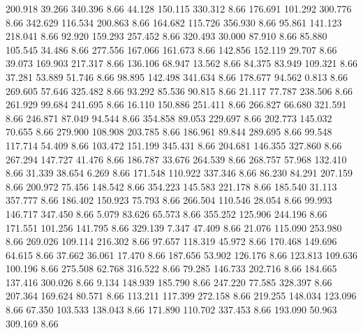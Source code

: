  200.918   39.266  340.396         8.66
  44.128  150.115  330.312         8.66
 176.691  101.292  300.776         8.66
 342.629  116.534  200.863         8.66
 164.682  115.726  356.930         8.66
  95.861  141.123  218.041         8.66
  92.920  159.293  257.452         8.66
 320.493   30.000   87.910         8.66
  85.880  105.545   34.486         8.66
 277.556  167.066  161.673         8.66
 142.856  152.119   29.707         8.66
  39.073  169.903  217.317         8.66
 136.106   68.947   13.562         8.66
  84.375   83.949  109.321         8.66
  37.281   53.889   51.746         8.66
  98.895  142.498  341.634         8.66
 178.677   94.562    0.813         8.66
 269.605   57.646  325.482         8.66
  93.292   85.536   90.815         8.66
  21.117   77.787  238.506         8.66
 261.929   99.684  241.695         8.66
  16.110  150.886  251.411         8.66
 266.827   66.680  321.591         8.66
 246.871   87.049   94.544         8.66
 354.858   89.053  229.697         8.66
 202.773  145.032   70.655         8.66
 279.900  108.908  203.785         8.66
 186.961   89.844  289.695         8.66
  99.548  117.714   54.409         8.66
 103.472  151.199  345.431         8.66
 204.681  146.355  327.860         8.66
 267.294  147.727   41.476         8.66
 186.787   33.676  264.539         8.66
 268.757   57.968  132.410         8.66
  31.339   38.654    6.269         8.66
 171.548  110.922  337.346         8.66
  86.230   84.291  207.159         8.66
 200.972   75.456  148.542         8.66
 354.223  145.583  221.178         8.66
 185.540   31.113  357.777         8.66
 186.402  150.923   75.793         8.66
 266.504  110.546   28.054         8.66
  99.993  146.717  347.450         8.66
   5.079   83.626   65.573         8.66
 355.252  125.906  244.196         8.66
 171.551  101.256  141.795         8.66
 329.139    7.347   47.409         8.66
  21.076  115.090  253.980         8.66
 269.026  109.114  216.302         8.66
  97.657  118.319   45.972         8.66
 170.468  149.696   64.615         8.66
  37.662   36.061   17.470         8.66
 187.656   53.902  126.176         8.66
 123.813  109.636  100.196         8.66
 275.508   62.768  316.522         8.66
  79.285  146.733  202.716         8.66
 184.665  137.416  300.026         8.66
   9.134  148.939  185.790         8.66
 247.220   77.585  328.397         8.66
 207.364  169.624   80.571         8.66
 113.211  117.399  272.158         8.66
 219.255  148.034  123.096         8.66
  67.350  103.533  138.043         8.66
 171.890  110.702  337.453         8.66
 193.090   50.963  309.169         8.66
